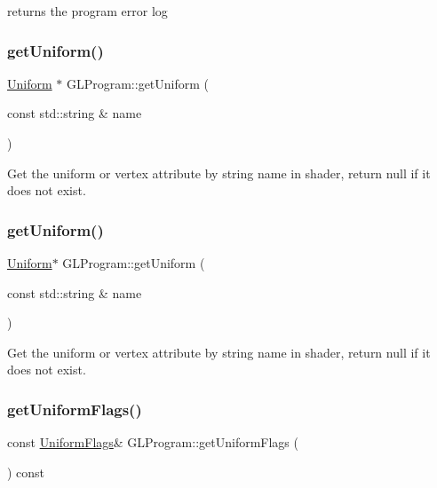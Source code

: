 returns the program error log \mbox{\label{classGLProgram_ad22023040928ac3f82fc1b36ce31e995}} 
\subsubsection{\texorpdfstring{get\+Uniform()}{getUniform()}\hspace{0.1cm}{\footnotesize\ttfamily [1/2]}}
{\footnotesize\ttfamily \hyperlink{structUniform}{Uniform} $\ast$ G\+L\+Program\+::get\+Uniform (\begin{DoxyParamCaption}\item[{const std\+::string \&}]{name }\end{DoxyParamCaption})}

Get the uniform or vertex attribute by string name in shader, return null if it does not exist. \mbox{\label{classGLProgram_a124306134c72cd3f3f3ea1f5a9e9a7e4}} 
\subsubsection{\texorpdfstring{get\+Uniform()}{getUniform()}\hspace{0.1cm}{\footnotesize\ttfamily [2/2]}}
{\footnotesize\ttfamily \hyperlink{structUniform}{Uniform}$\ast$ G\+L\+Program\+::get\+Uniform (\begin{DoxyParamCaption}\item[{const std\+::string \&}]{name }\end{DoxyParamCaption})}

Get the uniform or vertex attribute by string name in shader, return null if it does not exist. \mbox{\label{classGLProgram_a809306485fbc3534053138ec531dbc97}} 
\subsubsection{\texorpdfstring{get\+Uniform\+Flags()}{getUniformFlags()}\hspace{0.1cm}{\footnotesize\ttfamily [1/2]}}
{\footnotesize\ttfamily const \hyperlink{structGLProgram_1_1UniformFlags}{Uniform\+Flags}\& G\+L\+Program\+::get\+Uniform\+Flags (\begin{DoxyParamCaption}{ }\end{DoxyParamCaption}) const\hspace{0.3cm}{\ttfamily [inline]}}

